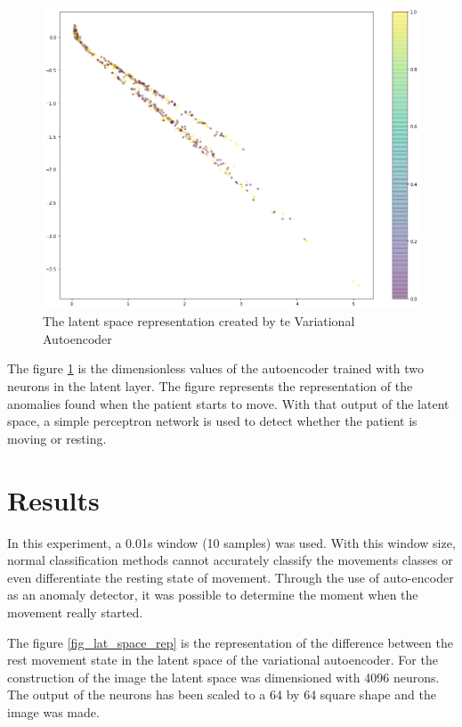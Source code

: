 \documentclass[nouppercase]{ifmbe}
\begin{document}
\begin{figure}[h]
\centering
\includegraphics[width=.8\linewidth]{figuras/latent_space_vae.png}
\caption{The latent space representation created by te Variational Autoencoder} \label{fig_lat_space}
\end{figure}

The figure \ref{fig_lat_space} is the dimensionless values of the autoencoder trained with two neurons in the latent layer. The figure represents the representation of the anomalies found when the patient starts to move. With that output of the latent space, a simple perceptron network is used to detect whether the patient is moving or resting.

\section{Results}

In this experiment, a 0.01s window (10 samples) was used. With this window size, normal classification methods cannot accurately classify the movements classes or even differentiate the resting state of movement. Through the use of auto-encoder as an anomaly detector, it was possible to determine the moment when the movement really started.

The figure \ref{fig_lat_space_rep} is the representation of the difference between the rest movement state in the latent space of the variational autoencoder. For the construction of the image the latent space was dimensioned with 4096 neurons. The output of the neurons has been scaled to a 64 by 64 square shape and the image was made.
\end{document}
